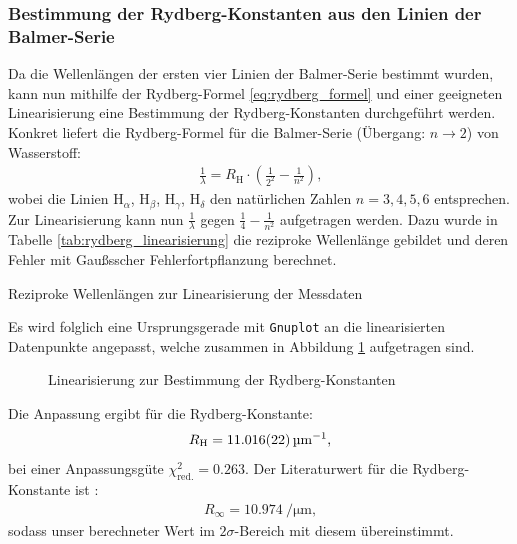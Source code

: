 \documentclass[11pt, a4paper]{article}
\numberwithin{equation}{section}
\begin{document}
\subsubsection{Bestimmung der Rydberg-Konstanten aus den Linien der Balmer-Serie}
Da die Wellenlängen der ersten vier Linien der Balmer-Serie bestimmt wurden, kann nun mithilfe der Rydberg-Formel \eqref{eq:rydberg_formel} und einer geeigneten Linearisierung eine Bestimmung der Rydberg-Konstanten durchgeführt werden.
Konkret liefert die Rydberg-Formel für die Balmer-Serie (Übergang: $n \rightarrow 2$) von Wasserstoff:
\begin{align*}
	\frac{1}{\lambda} = R_\mathrm{H} \cdot \left(\frac{1}{2^2} - \frac{1}{n^2} \right) \text{,}
\end{align*}
wobei die Linien H$_\alpha$, H$_\beta$, H$_\gamma$, H$_\delta$ den natürlichen Zahlen $n = 3, 4, 5, 6$ entsprechen.
Zur Linearisierung kann nun $\frac{1}{\lambda}$ gegen $\frac{1}{4} - \frac{1}{n^2}$ aufgetragen werden.
Dazu wurde in Tabelle \ref{tab:rydberg_linearisierung} die reziproke Wellenlänge gebildet und deren Fehler mit Gaußsscher Fehlerfortpflanzung berechnet.
\begin{table}[h]
	\centering
	
	\caption{Reziproke Wellenlängen zur Linearisierung der Messdaten}
	\label{tab:rydberg_linearisierung}
\end{table}
Es wird folglich eine Ursprungsgerade mit \texttt{Gnuplot} an die linearisierten Datenpunkte angepasst, welche zusammen in Abbildung \ref{fig:rydberg_balmer} aufgetragen sind.
\begin{figure}[h]
	\centering
	
	\caption{Linearisierung zur Bestimmung der Rydberg-Konstanten}
	\label{fig:rydberg_balmer}
\end{figure}
Die Anpassung ergibt für die Rydberg-Konstante:
\begin{align*}
	R_\mathrm{H} = \SI{11.016 +- 0.022}{\per\micro\metre} \text{,}
\end{align*}
bei einer Anpassungsgüte $\chi_\mathrm{red.}^2 = \num{0.263}$.
Der Literaturwert für die Rydberg-Konstante ist \cite{CODATA}:
\begin{align*}
	R_\infty= \SI{10.974}{\per\micro\metre} \text{,}
\end{align*}
sodass unser berechneter Wert im $2\sigma$-Bereich mit diesem übereinstimmt.
\end{document}

